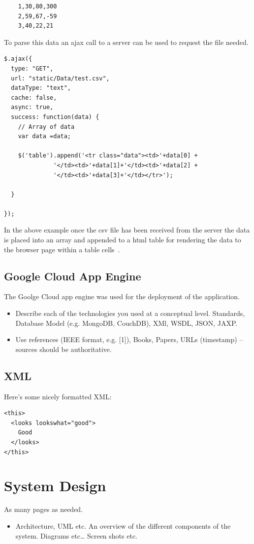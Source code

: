 \begin{verbatim}
	1,30,80,300
	2,59,67,-59
	3,40,22,21
\end{verbatim}

To parse this data an ajax call to a server can be used to request the file needed.~\cite{ParsingCSVExample:online}
\begin{verbatim}
$.ajax({
  type: "GET",
  url: "static/Data/test.csv",
  dataType: "text",
  cache: false,
  async: true,
  success: function(data) {
    // Array of data
    var data =data;

    $('table').append('<tr class="data"><td>'+data[0] + 
              '</td><td>'+data[1]+'</td><td>'+data[2] +
              '</td><td>'+data[3]+'</td></tr>');

  }

});
\end{verbatim}
In the above example once the csv file has been received from the server the data is placed into an array and appended to a html table for rendering the data to the browser page within a table cells~\cite{ParsingCSVExample:online}.
\section{Google Cloud App Engine}
The Goolge Cloud app engine was used for the deployment of the application. 
\begin{itemize}
\item Describe each of the technologies you used at a conceptual level. Standards, Database Model (e.g. MongoDB, CouchDB), XMl, WSDL, JSON, JAXP.
\item Use references (IEEE format, e.g. [1]), Books, Papers, URLs (timestamp) – sources should be authoritative. 
\end{itemize}

\section{XML}
Here's some nicely formatted XML:
\begin{verbatim}
<this>
  <looks lookswhat="good">
    Good
  </looks>
</this>
\end{verbatim}

\chapter{System Design}
As many pages as needed.
\begin{itemize}
\item Architecture, UML etc. An overview of the different components of the system. Diagrams etc… Screen shots etc.
\end{itemize}

